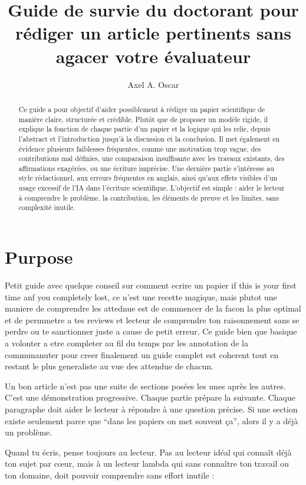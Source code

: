\documentclass[11pt,a4paper]{article}
\title{Guide de survie du doctorant pour rédiger un article pertinents sans agacer votre évaluateur}
\author{Axel A. Oscar}
\date{}
\theoremstyle{definition}
\begin{document}
\maketitle

\begin{abstract}
Ce guide a pour objectif d'aider possiblement à rédiger un papier scientifique de manière claire, structurée et crédible. Plutôt que de proposer un modèle rigide, il explique la fonction de chaque partie d'un papier et la logique qui les relie, depuis l'abstract et l'introduction jusqu'à la discussion et la conclusion. Il met également en évidence plusieurs faiblesses fréquentes, comme une motivation trop vague, des contributions mal définies, une comparaison insuffisante avec les travaux existants, des affirmations exagérées, ou une écriture imprécise. Une dernière partie s'intéresse au style rédactionnel, aux erreurs fréquentes en anglais, ainsi qu'aux effets visibles d'un usage excessif de l'IA dans l'écriture scientifique. L'objectif est simple : aider le lecteur à comprendre le problème, la contribution, les éléments de preuve et les limites, sans complexité inutile.
\end{abstract}

\tableofcontents


\section{Purpose}


Petit guide avec quelque conseil sur comment ecrire un papier if this is your first time anf you completely lost, ce n'est une recette magique, mais plutot une maniere de comprendre les attednue est de commencer de la facon la plus optimal et de permmetre a tes reviews et lecteur de comprendre ton raisonnement sans se perdre ou te sanctionner juste a cause de petit erreur. Ce guide bien que basique a volonter a etre completer au fil du temps par les annotation de la communanuter pour creer finalement un guide complet est coherent tout en restant le plus generaliste au vue des attendue de chacun.


Un bon article n'est pas une suite de sections posées les unes après les autres. C'est une démonstration progressive. Chaque partie prépare la suivante. Chaque paragraphe doit aider le lecteur à répondre à une question précise. Si une section existe seulement parce que ``dans les papiers on met souvent ça'', alors il y a déjà un problème. 

Quand tu écris, pense toujours au lecteur. Pas au lecteur idéal qui connaît déjà ton sujet par cœur, mais à un lecteur lambda qui sans connaître ton travail ou ton domaine, doit pouvoir comprendre sans effort inutile :
\end{document}
